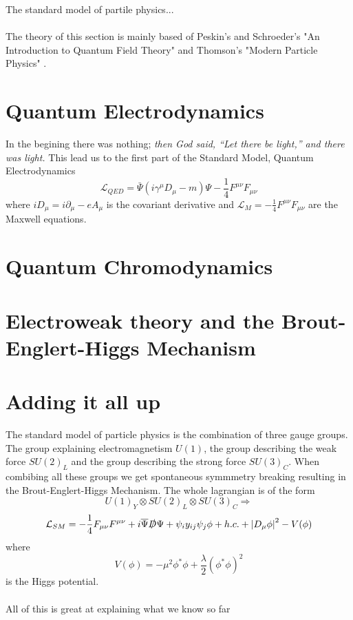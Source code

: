 \documentclass[12pt, a4paper]{book}
\begin{document}
The standard model of partile physics...\\
\\The theory of this section is mainly based of Peskin's and Schroeder's "An Introduction to Quantum Field Theory" \cite{Peskin:1995ev} and Thomson's "Modern Particle Physics" \cite{THOMSON}.

\clearpage
\section{Quantum Electrodynamics}
In the begining there was nothing; \textit{then God said, “Let there be light,” and there was light.} This lead us to the first part of the Standard Model, Quantum Electrodynamics
\begin{equation}\label{eq:QED}
    \mathcal{L}_{QED} = \bar{\Psi}\left(i\gamma^\mu D_\mu -m\right)\Psi -\frac{1}{4}F^{\mu\nu}F_{\mu\nu}
\end{equation}
where $iD_\mu = i\partial_\mu -eA_\mu$ is the covariant derivative and $\mathcal{L}_M = -\frac{1}{4}F^{\mu\nu}F_{\mu\nu}$ are the Maxwell equations.
\clearpage
\section{Quantum Chromodynamics}
\section{Electroweak theory and the Brout-Englert-Higgs Mechanism}
\section{Adding it all up}
The standard model of particle physics is the combination of three gauge groups. The group explaining electromagnetism $U(1)$, the group describing the weak force $SU(2)_L$ and the group describing the strong force $SU(3)_C$. 
When combibing all these groups we get spontaneous symmmetry breaking resulting in the Brout-Englert-Higgs Mechanism. The whole lagrangian is of the form
$$
U(1)_Y\otimes SU(2)_L\otimes SU(3)_C \Rightarrow 
$$
\begin{equation}
    \mathcal{L}_{SM} = -\frac{1}{4}F_{\mu\nu}F^{\mu\nu} + i\overline{\Psi}\slashed{D}\Psi + \psi_iy_{ij}\psi_j\phi + h.c. + \abs{D_\mu\phi}^2 - V(\phi)
\end{equation}
where 
$$
V(\phi)=-\mu^2\phi^*\phi + \frac{\lambda}{2}(\phi^*\phi)^2
$$
is the Higgs potential.\\
\\All of this is great at explaining what we know so far
\end{document}
